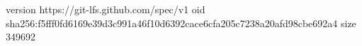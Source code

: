 version https://git-lfs.github.com/spec/v1
oid sha256:f5fff0fd6169e39d3c991a46f10d6392cace6cfa205c7238a20afd98cbe692a4
size 349692
